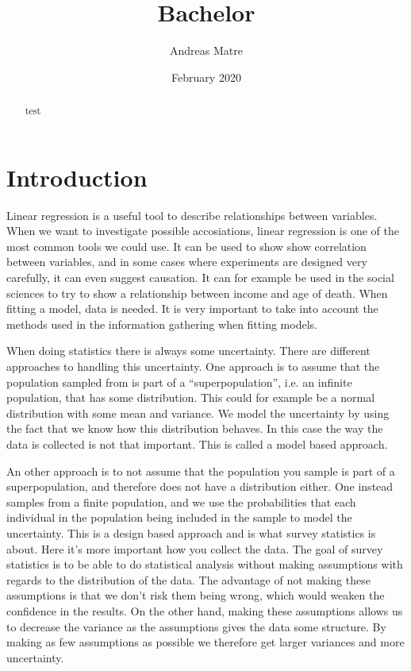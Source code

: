 \documentclass{article}
\title{Bachelor}
\author{Andreas Matre}
\date{February 2020}
\begin{document}
\newtheorem{definition}{Definition}[section]
\newtheorem{theorem}{Theorem}
\newtheorem{example}{Example}[section]


\maketitle

\begin{abstract}
 test 
\end{abstract}

\tableofcontents

\section{Introduction}

Linear regression is a useful tool to describe relationships between variables.
When we want to investigate possible accosiations, linear regression
is one of the most common tools we could use. It can be used to show show correlation between
variables, and in some cases where experiments are designed very carefully, it can even suggest causation.
It can for example be used in the social sciences to try to show a relationship
between income and age of death.
When fitting a model, data is needed. It is very important to take into account the methods used in
the information gathering when fitting models.

When doing statistics there is always some uncertainty. There are different
approaches to handling this uncertainty. One approach is to assume that the population sampled from is part of a ``superpopulation'', i.e. an
infinite population, that has some distribution. This could for example be a
normal distribution with some mean and variance. We model the uncertainty by using the
fact that we know how this distribution behaves.
In this case the way the data
is collected is not that important. This is called a model based approach.


An other approach is to not assume that the population you sample is part of a
superpopulation, and therefore does not have a distribution either.
One instead samples from a finite population, and we use the probabilities that
each individual in the population being included in the sample to model the uncertainty.
This is a design based approach and is what survey statistics is about. Here it's more important how
you collect the data.
The goal of survey statistics is to be able to do statistical analysis without
making assumptions with regards to the distribution of the data. The advantage
of not making these assumptions is that we don't risk them being wrong, which
would weaken the confidence in the results. On the other hand,
making these assumptions allows us to decrease the variance as the assumptions
gives the data some structure. By making as few assumptions as possible we
therefore get larger variances and more uncertainty.
\end{document}
